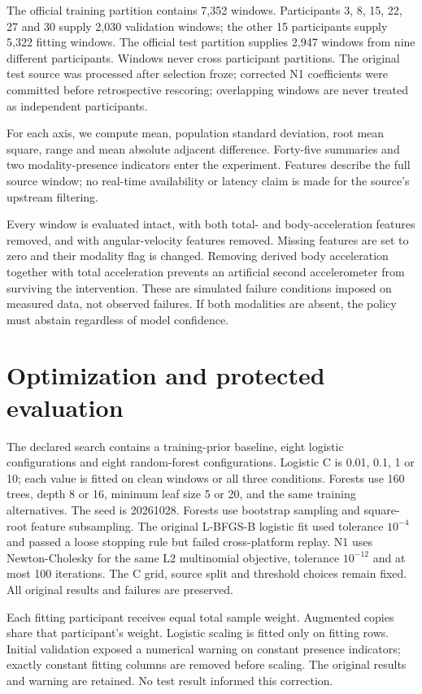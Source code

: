 \documentclass[11pt]{article}
\begin{document}
The official training partition contains 7,352 windows. Participants 3, 8, 15, 22, 27 and 30 supply 2,030 validation windows; the other 15 participants supply 5,322 fitting windows. The official test partition supplies 2,947 windows from nine different participants. Windows never cross participant partitions. The original test source was processed after selection froze; corrected N1 coefficients were committed before retrospective rescoring; overlapping windows are never treated as independent participants.

For each axis, we compute mean, population standard deviation, root mean square, range and mean absolute adjacent difference. Forty-five summaries and two modality-presence indicators enter the experiment. Features describe the full source window; no real-time availability or latency claim is made for the source's upstream filtering.

Every window is evaluated intact, with both total- and body-acceleration features removed, and with angular-velocity features removed. Missing features are set to zero and their modality flag is changed. Removing derived body acceleration together with total acceleration prevents an artificial second accelerometer from surviving the intervention. These are simulated failure conditions imposed on measured data, not observed failures. If both modalities are absent, the policy must abstain regardless of model confidence.

\section{Optimization and protected evaluation}
The declared search contains a training-prior baseline, eight logistic configurations and eight random-forest configurations. Logistic C is 0.01, 0.1, 1 or 10; each value is fitted on clean windows or all three conditions. Forests use 160 trees, depth 8 or 16, minimum leaf size 5 or 20, and the same training alternatives. The seed is 20261028. Forests use bootstrap sampling and square-root feature subsampling. The original L-BFGS-B logistic fit used tolerance $10^{-4}$ and passed a loose stopping rule but failed cross-platform replay. N1 uses Newton-Cholesky for the same L2 multinomial objective, tolerance $10^{-12}$ and at most 100 iterations. The C grid, source split and threshold choices remain fixed. All original results and failures are preserved.

Each fitting participant receives equal total sample weight. Augmented copies share that participant's weight. Logistic scaling is fitted only on fitting rows. Initial validation exposed a numerical warning on constant presence indicators; exactly constant fitting columns are removed before scaling. The original results and warning are retained. No test result informed this correction.
\end{document}
